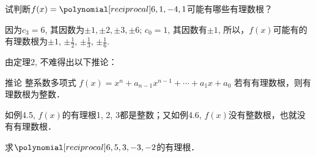 \begin{example}
    试判断$f(x)=\poly{6,1,-4,1}$可能有哪些有理数根？
\end{example}

\begin{solution}
    因为$c_3=6$, 其因数为$\pm 1,\pm 2,\pm 3,\pm 6$; 
    $c_0=1$, 其因数有$\pm 1$, 所以，$f(x)$可能有的有理数根为$\pm 1$,
    $\pm\frac{1}{2}$, $\pm \frac{1}{3}$, $\pm \frac{1}{6}$.
\end{solution}

由定理2, 不难得出以下推论：

\begin{blk}{推论}
  整系数多项式  $f (x) =x^n+a_{n-1}x^{n-1}+\cdots+a_1x+a_0$ 若有有理数根，则有理数根为整数．
\end{blk}

如例4.5, $f(x)$的有理根1, 2, 3都是整数；又如例4.6,
$f(x)$没有整数根，也就没有有理数根．

\begin{example}
    求$\poly{6,5,3,-3,-2}$的有理根．
\end{example}

